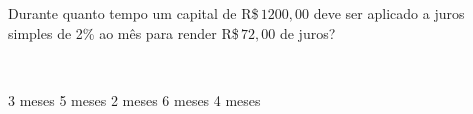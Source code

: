 \parbox{\linewidth}{

Durante quanto tempo um capital de R\$\,$1200{,}00$ deve ser aplicado a juros simples de 2\% ao mês para render R\$\,$72{,}00$ de juros?}
\vspace{2mm}
\\\parbox{\linewidth}{

3 meses
5 meses
2 meses
6 meses
4 meses

}

